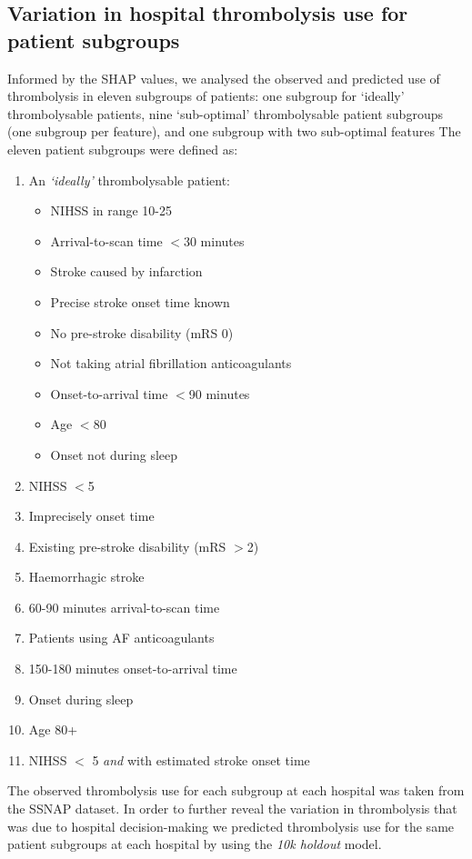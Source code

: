 
\subsection{Variation in hospital thrombolysis use for patient subgroups}

Informed by the SHAP values, we analysed the observed and predicted use of thrombolysis in eleven subgroups of patients: one subgroup for `ideally' thrombolysable patients, nine `sub-optimal' thrombolysable patient subgroups (one subgroup per feature), and one subgroup with two sub-optimal features The eleven patient subgroups were defined as:

\begin{enumerate}
  \item An \emph{`ideally'} thrombolysable patient:
  \begin{itemize}
    \setlength\itemsep{-2mm}
    \item NIHSS in range 10-25
    \item Arrival-to-scan time $<$30 minutes
    \item Stroke caused by infarction
    \item Precise stroke onset time known
    \item No pre-stroke disability (mRS 0)
    \item Not taking atrial fibrillation anticoagulants
    \item Onset-to-arrival time $<$90 minutes
    \item Age $<$80
    \item Onset not during sleep
  \end{itemize}
  \item NIHSS $<$5
  \item Imprecisely onset time
  \item Existing pre-stroke disability (mRS $>$2)
  \item Haemorrhagic stroke
  \item 60-90 minutes arrival-to-scan time
  \item Patients using AF anticoagulants
  \item 150-180 minutes onset-to-arrival time
  \item Onset during sleep
  \item Age 80+
  \item NIHSS $<$ 5 \emph{and} with estimated stroke onset time
\end{enumerate}

The observed thrombolysis use for each subgroup at each hospital was taken from the SSNAP dataset. In order to further reveal the variation in thrombolysis that was due to hospital decision-making we predicted thrombolysis use for the same patient subgroups at each hospital by using the \emph{10k holdout} model.

